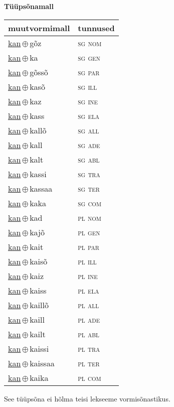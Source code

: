 

\vspace{3.5em}
\noindent \begin{minipage}{\textwidth}
\noindent \textbf{Tüüpsõnamall \,}\\

\begin{sideways}
\begin{tabular}{l l}
muutvormimall & tunnused \\
\hline
\underline{kan}\,$\oplus$\,gõz & \textsc{ sg nom } \\
\underline{kan}\,$\oplus$\,ka & \textsc{ sg gen } \\
\underline{kan}\,$\oplus$\,gõssõ & \textsc{ sg par } \\
\underline{kan}\,$\oplus$\,kasõ & \textsc{ sg ill } \\
\underline{kan}\,$\oplus$\,kaz & \textsc{ sg ine } \\
\underline{kan}\,$\oplus$\,kass & \textsc{ sg ela } \\
\underline{kan}\,$\oplus$\,kallõ & \textsc{ sg all } \\
\underline{kan}\,$\oplus$\,kall & \textsc{ sg ade } \\
\underline{kan}\,$\oplus$\,kalt & \textsc{ sg abl } \\
\underline{kan}\,$\oplus$\,kassi & \textsc{ sg tra } \\
\underline{kan}\,$\oplus$\,kassaa & \textsc{ sg ter } \\
\underline{kan}\,$\oplus$\,kaka & \textsc{ sg com } \\
\underline{kan}\,$\oplus$\,kad & \textsc{ pl nom } \\
\underline{kan}\,$\oplus$\,kajõ & \textsc{ pl gen } \\
\underline{kan}\,$\oplus$\,kait & \textsc{ pl par } \\
\underline{kan}\,$\oplus$\,kaisõ & \textsc{ pl ill } \\
\underline{kan}\,$\oplus$\,kaiz & \textsc{ pl ine } \\
\underline{kan}\,$\oplus$\,kaiss & \textsc{ pl ela } \\
\underline{kan}\,$\oplus$\,kaillõ & \textsc{ pl all } \\
\underline{kan}\,$\oplus$\,kaill & \textsc{ pl ade } \\
\underline{kan}\,$\oplus$\,kailt & \textsc{ pl abl } \\
\underline{kan}\,$\oplus$\,kaissi & \textsc{ pl tra } \\
\underline{kan}\,$\oplus$\,kaissaa & \textsc{ pl ter } \\
\underline{kan}\,$\oplus$\,kaika & \textsc{ pl com } \\
\end{tabular}
\end{sideways}
\label{tab:tüüpsõnamall-kangõz}

\end{minipage}

 
\vspace{1em}
\noindent See tüüpsõna ei hõlma teisi lekseeme vormi\-sõnastikus.
